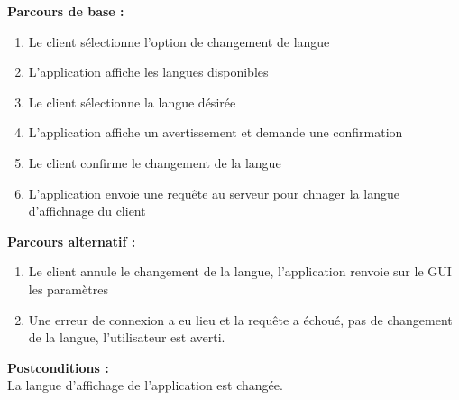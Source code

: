 \documentclass[../rapport.tex]{subfiles}
\begin{document}
\textbf{Parcours de base :} \\
\begin{enumerate}
    \item Le client sélectionne l'option de changement de langue
    \item L'application affiche les langues disponibles
    \item Le client sélectionne la langue désirée
    \item L'application affiche un avertissement et demande une confirmation
    \item Le client confirme le changement de la langue
    \item L'application envoie une requête au serveur pour chnager la langue d'affichnage du client
\end{enumerate}
\bigskip

\textbf{Parcours alternatif :}
\begin{enumerate}
    \item Le client annule le changement de la langue, l'application renvoie sur le GUI les paramètres
    \item Une erreur de connexion a eu lieu et la requête a échoué, pas de changement de la langue, l'utilisateur est averti.
\end{enumerate}

\textbf{Postconditions :} \\
La langue d'affichage de l'application est changée.

\newpage
\end{document}
